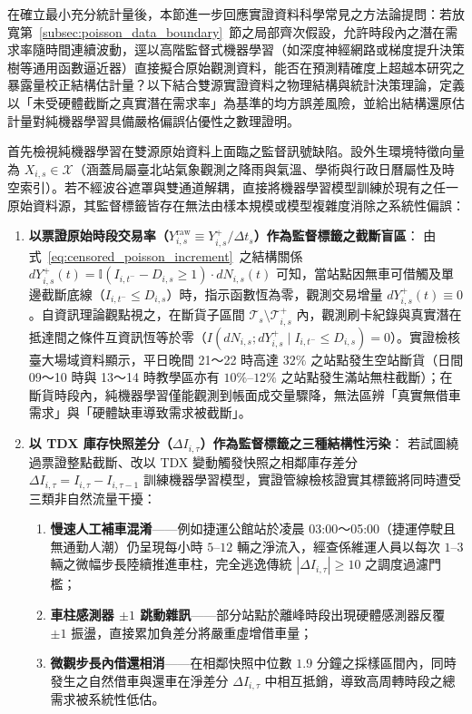 在確立最小充分統計量後，本節進一步回應實證資料科學常見之方法論提問：若放寬第~\ref{subsec:poisson_data_boundary}~節之局部齊次假設，允許時段內之潛在需求率隨時間連續波動，逕以高階監督式機器學習（如深度神經網路或梯度提升決策樹等通用函數逼近器）直接擬合原始觀測資料，能否在預測精確度上超越本研究之暴露量校正結構估計量？以下結合雙源實證資料之物理結構與統計決策理論，定義以「未受硬體截斷之真實潛在需求率」為基準的均方誤差風險，並給出結構還原估計量對純機器學習具備嚴格偏誤佔優性之數理證明。

首先檢視純機器學習在雙源原始資料上面臨之監督訊號缺陷。設外生環境特徵向量為 $X_{i,s} \in \mathcal{X}$（涵蓋局屬臺北站氣象觀測之降雨與氣溫、學術與行政日曆屬性及時空索引）。若不經波谷遮罩與雙通道解耦，直接將機器學習模型訓練於現有之任一原始資料源，其監督標籤皆存在無法由樣本規模或模型複雜度消除之系統性偏誤：
\begin{enumerate}
    \item \textbf{以票證原始時段交易率（$Y^{\text{raw}}_{i,s} \equiv Y^+_{i,s} / \Delta t_s$）作為監督標籤之截斷盲區}：
    由式~\eqref{eq:censored_poisson_increment}~之結構關係 $dY^+_{i,s}(t) = \mathbb{I}(I_{i,t^-} - D_{i,s} \ge 1) \cdot dN_{i,s}(t)$ 可知，當站點因無車可借觸及單邊截斷底線（$I_{i,t^-} \le D_{i,s}$）時，指示函數恆為零，觀測交易增量 $dY^+_{i,s}(t) \equiv 0$。自資訊理論觀點視之，在斷貨子區間 $\mathcal{T}_s \setminus \mathcal{T}^+_{i,s}$ 內，觀測刷卡紀錄與真實潛在抵達間之條件互資訊恆等於零（$I(dN_{i,s}; dY^+_{i,s} \mid I_{i,t^-} \le D_{i,s}) = 0$）。實證檢核臺大場域資料顯示，平日晚間 21～22 時高達 $32\%$ 之站點發生空站斷貨（日間 09～10 時與 13～14 時教學區亦有 $10\%\text{--}12\%$ 之站點發生滿站無柱截斷）；在斷貨時段內，純機器學習僅能觀測到帳面成交量驟降，無法區辨「真實無借車需求」與「硬體缺車導致需求被截斷」。

    \item \textbf{以 TDX 庫存快照差分（$\Delta I_{i,\tau}$）作為監督標籤之三種結構性污染}：
    若試圖繞過票證整點截斷、改以 TDX 變動觸發快照之相鄰庫存差分 $\Delta I_{i,\tau} = I_{i,\tau} - I_{i,\tau-1}$ 訓練機器學習模型，實證管線檢核證實其標籤將同時遭受三類非自然流量干擾：
    \begin{enumerate}
      \item \textbf{慢速人工補車混淆}——例如捷運公館站於凌晨 03:00～05:00（捷運停駛且無通勤人潮）仍呈現每小時 $5\text{--}12$ 輛之淨流入，經查係維運人員以每次 $1\text{--}3$ 輛之微幅步長陸續推進車柱，完全逃逸傳統 $|\Delta I_{i,\tau}| \ge 10$ 之調度過濾門檻；
      \item \textbf{車柱感測器 $\pm 1$ 跳動雜訊}——部分站點於離峰時段出現硬體感測器反覆 $\pm 1$ 振盪，直接累加負差分將嚴重虛增借車量；
      \item \textbf{微觀步長內借還相消}——在相鄰快照中位數 $1.9$ 分鐘之採樣區間內，同時發生之自然借車與還車在淨差分 $\Delta I_{i,\tau}$ 中相互抵銷，導致高周轉時段之總需求被系統性低估。
    \end{enumerate}
\end{enumerate}

